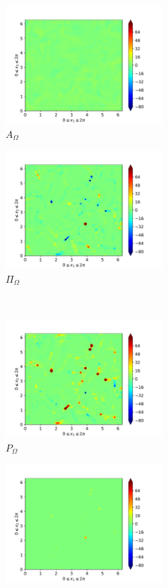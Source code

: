 \begin{figure}[H]
\begin{subfigure}{0.45\textwidth}
        \includegraphics[height=1.75in]{media/run-cds-65/A-enst-1340}
        \caption{$A_{\Omega}$}
    \end{subfigure}
    \newline
    \begin{subfigure}{0.45\textwidth}
        \includegraphics[height=1.75in]{media/run-cds-65/Pi-enst-1340}
        \caption{$\Pi_{\Omega}$}
    \end{subfigure}
    ~
    \begin{subfigure}{0.45\textwidth}
        \includegraphics[height=1.75in]{media/run-cds-65/P-enst-1340}
        \caption{$P_{\Omega}$}
    \end{subfigure}
    \newline
    \begin{subfigure}{0.45\textwidth}
        \includegraphics[height=1.75in]{media/run-cds-65/B-enst-1340}

\end{subfigure}
\end{figure}
